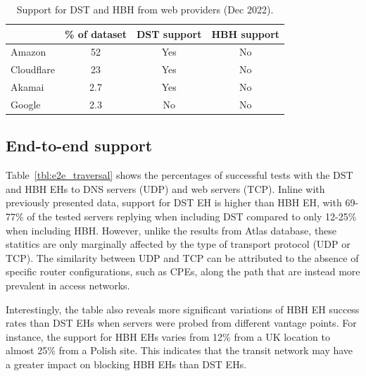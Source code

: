 \documentclass[conference]{IEEEtran}
\begin{document}
\begin{table} 
\centering
\caption{Support for DST and HBH from web providers (Dec 2022).}
\begin{tabular}{l|c|c|c}
           & \% of dataset & DST support & HBH support\\
\hline
\hline
Amazon       & 52                     & Yes                & No                 \\
\hline
Cloudflare   & 23                     & Yes                & No                 \\
\hline
Akamai       & 2.7                    & Yes                & No                 \\
\hline
Google       & 2.3                    & No                 & No                 
\end{tabular}
\label{tbl:web_providers}
\end{table}


\subsection{End-to-end support}
\label{subsec:e2esupport}

Table~\ref{tbl:e2e_traversal} shows the percentages of successful tests with
the DST and HBH EHs to DNS servers (UDP) and web servers (TCP).  Inline with
previously presented data, support for DST EH is higher than HBH EH, with
69-77\% of the tested servers replying when including DST compared to only
12-25\% when including HBH.  However, unlike the results from Atlas database,
these statitics are only marginally affected by the type of transport protocol
(UDP or TCP).  The similarity between UDP and TCP can be attributed to the
absence of specific router configurations, such as CPEs, along the path that
are instead more prevalent in access networks.


Interestingly, the table also reveals more significant variations of HBH EH
success rates than DST EHs when servers were probed from different vantage
points. For instance, the support for HBH EHs varies from 12\% from a UK
location to almost 25\% from a Polish site.  This indicates that the transit
network may have a greater impact on blocking HBH EHs than DST EHs.  

\end{document}
